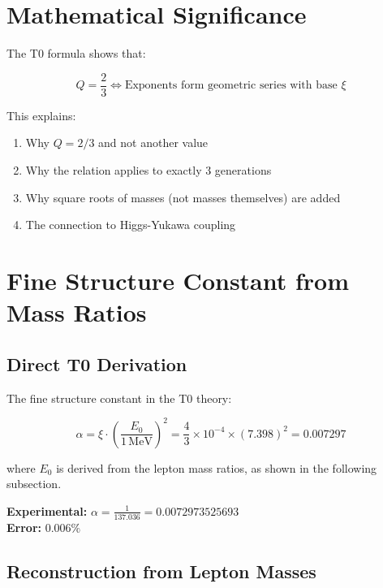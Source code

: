 	\section{Mathematical Significance}
	
	The T0 formula shows that:
	
	\begin{equation}
		Q = \frac{2}{3} \iff \text{Exponents form geometric series with base } \xi
	\end{equation}
	
	This explains:
	\begin{enumerate}
		\item Why $Q = 2/3$ and not another value
		\item Why the relation applies to exactly 3 generations
		\item Why square roots of masses (not masses themselves) are added
		\item The connection to Higgs-Yukawa coupling
	\end{enumerate}
	
	\section{Fine Structure Constant from Mass Ratios}
	
	\subsection{Direct T0 Derivation}
	
	The fine structure constant in the T0 theory:
	
	\begin{equation}
		\alpha = \xi \cdot \left(\frac{E_0}{1\,\text{MeV}}\right)^2 = \frac{4}{3} \times 10^{-4} \times (7.398)^2 = 0.007297
	\end{equation}
	
	where $E_0$ is derived from the lepton mass ratios, as shown in the following subsection.
	
	\textbf{Experimental:} $\alpha = \frac{1}{137.036} = 0.0072973525693$\\
	\textbf{Error:} $0.006\%$
	
	\subsection{Reconstruction from Lepton Masses}
	
